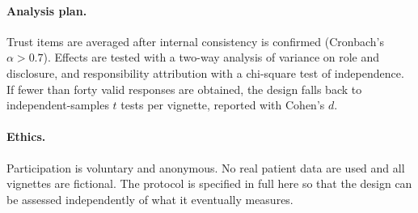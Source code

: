 \paragraph{Analysis plan.}
Trust items are averaged after internal consistency is confirmed (Cronbach's $\alpha>0.7$). Effects are tested with a two-way analysis of variance on role and disclosure, and responsibility attribution with a chi-square test of independence. If fewer than forty valid responses are obtained, the design falls back to independent-samples $t$ tests per vignette, reported with Cohen's $d$.

\paragraph{Ethics.}
Participation is voluntary and anonymous. No real patient data are used and all vignettes are fictional. The protocol is specified in full here so that the design can be assessed independently of what it eventually measures.
